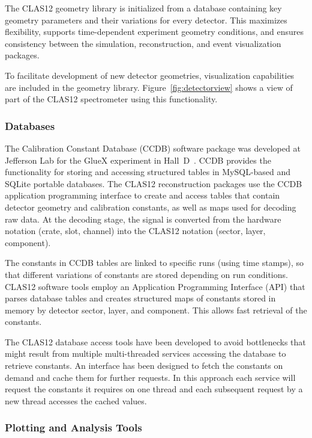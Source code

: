 The CLAS12 geometry library is initialized from a database containing key geometry parameters and their
variations for every detector.  This maximizes flexibility, supports time-dependent experiment geometry
conditions, and ensures consistency between the simulation, reconstruction, and event visualization packages.

To facilitate development of new detector geometries, visualization capabilities are included in the geometry library.
Figure~\ref{fig:detectorview} shows a view of part of the CLAS12 spectrometer using this functionality.

\subsubsection{Databases}

The Calibration Constant Database (CCDB) software package was developed at Jefferson Lab for the GlueX
experiment in Hall~D~\cite{gluex}.  CCDB provides the functionality for storing and accessing structured tables in
MySQL-based and SQLite portable databases. The CLAS12 reconstruction packages use the CCDB application
programming interface to create and access tables that contain detector geometry and calibration constants, as
well as maps used for decoding raw data. At the decoding stage, the signal is converted from the hardware notation
(crate, slot, channel) into the CLAS12 notation (sector, layer, component). 

The constants in CCDB tables are linked  to specific runs (using time stamps), so that different
variations of constants are stored depending on run conditions. CLAS12 software tools employ an Application Programming
Interface (API) that parses database tables and creates structured maps of constants stored in  memory by
detector sector, layer, and component. This allows fast retrieval of the constants.

The CLAS12 database access tools have been developed to avoid bottlenecks that might result from multiple
multi-threaded services accessing the database to retrieve constants.  An interface has been designed to fetch
the constants on demand and cache them for further requests. In this approach each service will request the
constants it requires on one thread and each subsequent request by a new thread accesses
the cached values.

\subsubsection{Plotting and Analysis Tools}

